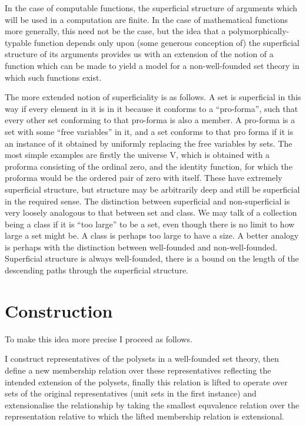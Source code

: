 \documentclass[numreferences]{rbjk}
\begin{document}
\begin{article}
In the case of computable functions, the superficial structure of arguments which will be used in a computation are finite.
In the case of mathematical functions more generally, this need not be the case, but the idea that a polymorphically-typable function depends only upon (some generous conception of) the superficial structure of its arguments provides us with an extension of the notion of a function which can be made to yield a model for a non-well-founded set theory in which such functions exist.

The more extended notion of superficiality is as follows.
A set is superficial in this way if every element in it is in it because it conforms to a ``pro-forma'', such that every other set conforming to that pro-forma is also a member.
A pro-forma is a set with some ``free variables'' in it, and a set conforms to that pro forma if it is an instance of it obtained by uniformly replacing the free variables by sets.
The most simple examples are firstly the universe V, which is obtained with a proforma consisting of the ordinal zero, and the identity function, for which the proforma would be the ordered pair of zero with itself.
These have extremely superficial structure, but structure may be arbitrarily deep and still be superficial in the required sense.
The distinction between superficial and non-superficial is very loosely analogous to that between set and class.
We may talk of a collection being a class if it is ``too large'' to be a set, even though there is no limit to how large a set might be.
A class is perhaps too large to have a size.
A better analogy is perhaps with the distinction between well-founded and non-well-founded.
Superficial structure is always well-founded, there is a bound on the length of the descending paths through the superficial structure.

\section{Construction}
To make this idea more precise I proceed as follows.

I construct representatives of the polysets in a well-founded set theory, then define a new membership relation over these representatives reflecting the intended extension of the polysets, finally this relation is lifted to operate over sets of the original representatives (unit sets in the first instance) and extensionalise the relationship by taking the smallest equvalence relation over the representation relative to which the lifted membership relation is extensional.


\end{article}
\end{document}
